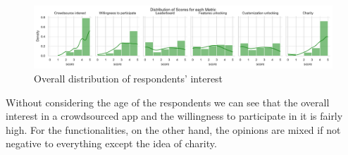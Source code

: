 \documentclass[a4paper, 11pt]{report}
\begin{document}
\begin{figure}[H]
	\centering
	\includegraphics[width=.9\textwidth]{img/analysis/distribution_of_scores_for_each_metric.pdf}
	\caption{Overall distribution of respondents' interest}
\end{figure}
\noindent Without considering the age of the respondents we can see that the
overall interest in a crowdsourced app and the willingness to participate in
it is fairly high. For the functionalities, on the other hand, the opinions are mixed if not negative
to everything except the idea of charity.
\end{document}
